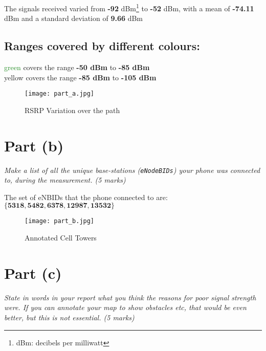 \documentclass[11pt, fleqn]{article}
\begin{document}
The signals received varied from \textbf{-92} dBm\footnote{dBm:  decibels per milliwatt} to \textbf{-52} dBm, with a mean of \textbf{-74.11} dBm and a standard deviation of \textbf{9.66} dBm

\subsection*{Ranges covered by different colours:}

\textcolor{ForestGreen}{green} covers the range \textbf{-50 dBm} to \textbf{-85 dBm}\\
\textcolor{Apricot}{yellow} covers the range \textbf{-85 dBm} to \textbf{-105 dBm}

\vspace*{\fill}
\begin{figure}[H]
    \centering
    \texttt{[image: part\_a.jpg]}
    \caption{RSRP Variation over the path}
    \label{fig:part_a}
\end{figure}
\vspace*{\fill}

\newpage
\section*{Part (b)}
\label{partb}
\setcounter{equation}{0}

\textit{Make a list of all the unique base-stations (\texttt{eNodeBIDs}) your phone was connected to, during the measurement. (5 marks)}

\medskip

The set of eNBIDs that the phone connected to are: 
$\mathbf{\{ 5318, 5482, 6378, 12987, 13532 \}}$\\

\begin{figure}[H]
    \centering
    \texttt{[image: part\_b.jpg]}
    \caption{Annotated Cell Towers}
    \label{fig:part_b}
\end{figure}


\newpage
\section*{Part (c)}
\label{partc}
\setcounter{equation}{0}

\textit{State in words in your report what you think the reasons for poor signal strength were. If you can annotate your map to show obstacles etc, that would be even better, but this is not essential. (5 marks)}\\
\end{document}
